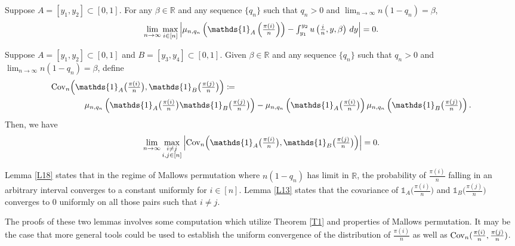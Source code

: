 \begin{lemma}\label{L18}
Suppose $A = [y_1, y_2] \subset [0,1]$. For any $\beta \in \mathbb{R}$ and any sequence $\{q_n \}$ such that $q_n > 0$ and $\lim_{n \to \infty} n (1 - q_n) = \beta$,
\[
\textstyle\lim\limits_{n \to \infty}\max\limits_{i \in [n]}
  \left| \n \left(\mathds{1}_A\left(\frac{\pi(i)}{n}\right) \right) - \int_{y_1}^{y_2} u\left(\frac{i}{n}, y, \beta \right)\, dy \right| = 0.
\]
\end{lemma}



\begin{lemma}\label{L13}
Suppose $A = [y_1, y_2] \subset [0, 1]$ and $B = [y_3, y_4] \subset [0, 1]$. Given $\beta \in \mathbb{R}$ and any sequence $\{q_n \}$ such that $q_n > 0$ and $\lim_{n \to \infty} n (1 - q_n) = \beta$, define
\begin{align*}
&\textstyle\cov_n\Big(\mathds{1}_A\big(\frac{\pi(i)}{n}\big), \mathds{1}_B\big(\frac{\pi(j)}{n}\big)\Big) \coloneqq\\
&\textstyle\qquad\qquad \n \left(\mathds{1}_A\big(\frac{\pi(i)}{n}\big)\mathds{1}_B\big(\frac{\pi(j)}{n}\big)\right) -
     \n \left(\mathds{1}_A\big(\frac{\pi(i)}{n}\big)\right) \n \left(\mathds{1}_B\big(\frac{\pi(j)}{n}\big)\right).
\end{align*}
Then, we have
\[
\textstyle\lim\limits_{n \to \infty}\max\limits_{\substack{ i \neq j\\
                                   i, j \in [n]}}
    \left| \cov_n\Big(\mathds{1}_A\big(\frac{\pi(i)}{n}\big), \mathds{1}_B\big(\frac{\pi(j)}{n}\big)\Big) \right| = 0.
\]
\end{lemma}

Lemma \ref{L18} states that in the regime of Mallows permutation where $n(1-q_n)$ has limit in $\mathbb{R}$, the probability of $\frac{\pi(i)}{n}$ falling in an arbitrary interval converges to a constant uniformly for $i \in [n]$. Lemma \ref{L13} states that the covariance of $\mathds{1}_A\big(\frac{\pi(i)}{n}\big)$ and $\mathds{1}_B\big(\frac{\pi(j)}{n}\big)$ converges to 0 uniformly on all those pairs such that $i \neq j$. 

The proofs of these two lemmas involves some computation which utilize Theorem \ref{T1} and properties of Mallows permutation. It may be the case that more general tools could be used to establish the uniform convergence of the distribution of $\frac{\pi(i)}{n}$ as well as 
$\text{Cov}_n(\frac{\pi(i)}{n}, \frac{\pi(j)}{n})$.



